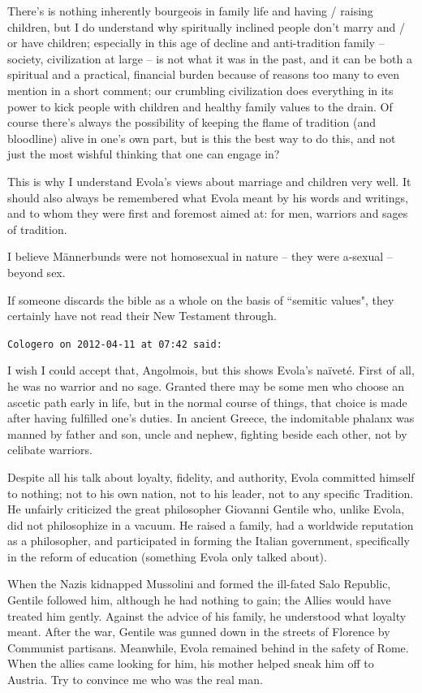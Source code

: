 \begin{footnotesize}
\begin{sffamily}
There's is nothing inherently bourgeois in family life and having / raising children, but I do understand why spiritually inclined people don't marry and / or have children; especially in this age of decline and anti-tradition family – society, civilization at large – is not what it was in the past, and it can be both a spiritual and a practical, financial burden because of reasons too many to even mention in a short comment; our crumbling civilization does everything in its power to kick people with children and healthy family values to the drain. Of course there's always the possibility of keeping the flame of tradition (and bloodline) alive in one's own part, but is this the best way to do this, and not just the most wishful thinking that one can engage in?

This is why I understand Evola's views about marriage and children very well. It should also always be remembered what Evola meant by his words and writings, and to whom they were first and foremost aimed at: for men, warriors and sages of tradition.

I believe Männerbunds were not homosexual in nature – they were a-sexual – beyond sex.

If someone discards the bible as a whole on the basis of ``semitic values", they certainly have not read their New Testament through.


\hfill

\texttt{Cologero on 2012-04-11 at 07:42 said: }

I wish I could accept that, Angolmois, but this shows Evola's naïveté. First of all, he was no warrior and no sage. Granted there may be some men who choose an ascetic path early in life, but in the normal course of things, that choice is made after having fulfilled one's duties. In ancient Greece, the indomitable phalanx was manned by father and son, uncle and nephew, fighting beside each other, not by celibate warriors.

Despite all his talk about loyalty, fidelity, and authority, Evola committed himself to nothing; not to his own nation, not to his leader, not to any specific Tradition. He unfairly criticized the great philosopher Giovanni Gentile who, unlike Evola, did not philosophize in a vacuum. He raised a family, had a worldwide reputation as a philosopher, and participated in forming the Italian government, specifically in the reform of education (something Evola only talked about).

When the Nazis kidnapped Mussolini and formed the ill-fated Salo Republic, Gentile followed him, although he had nothing to gain; the Allies would have treated him gently. Against the advice of his family, he understood what loyalty meant. After the war, Gentile was gunned down in the streets of Florence by Communist partisans. Meanwhile, Evola remained behind in the safety of Rome. When the allies came looking for him, his mother helped sneak him off to Austria. Try to convince me who was the real man.


\end{sffamily}
\end{footnotesize}
